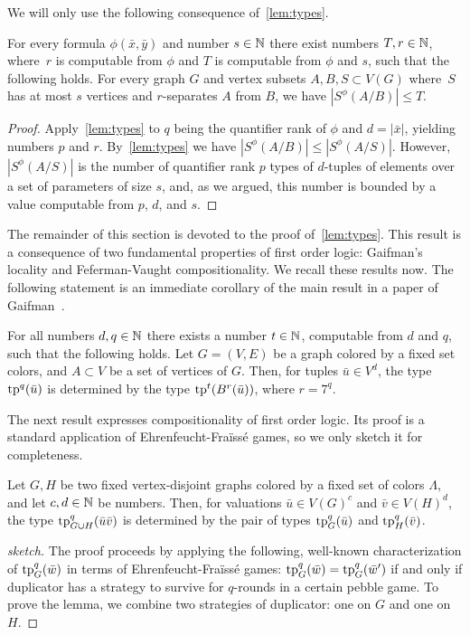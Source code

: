 We will only use the following consequence of~\cref{lem:types}.

\begin{corollary}\label{cor:bound}
For every formula $\phi(\bar x,\bar y)$ 
and number $s\in \mathbb{N}$
there exist numbers $T,r\in \mathbb{N}$,
where~$r$ is computable from $\phi$ and $T$ is computable from $\phi$ and $s$,
  such that the following holds. For every graph $G$ and vertex subsets $A,B,S\subset V(G)$ 
  where~$S$ has at most $s$ vertices and $r$-separates $A$ from $B$, we have $|S^\phi(A/B)|\le T$.
\end{corollary}
\begin{proof}
Apply~\cref{lem:types} to $q$ being the quantifier rank of $\phi$ and $d=|\bar x|$, yielding numbers $p$ and $r$.
By~\cref{lem:types} we have $|S^\phi(A/B)|\leq |S^\phi(A/S)|$.
However, $|S^\phi(A/S)|$ is the number of quantifier rank $p$ types of $d$-tuples of elements over a set of parameters of size $s$, and, as we argued, this number is bounded by a value computable from $p$, $d$, and $s$.
\end{proof}

The remainder of this section is devoted to the proof of~\cref{lem:types}.
This result is a consequence of two fundamental properties of first order logic:
Gaifman's locality and Feferman-Vaught compositionality. We recall these results now.
The following statement is an immediate corollary of the main result in a paper of Gaifman~\cite{gaifman1982local}.

\begin{lemma}\label{lem:gaif}
  For all numbers $d,q\in \mathbb{N}$ there exists a number $t\in \mathbb{N}$, computable from $d$ and $q$, such that the following holds.
  Let $G=(V,E)$ be a graph colored by a fixed set colors, and $A\subset V$ be a set of vertices of $G$.
  Then, for tuples $\bar u\in V^d$, the type  $\mathrm{tp}^q(\bar u)$ is determined by the type $\mathrm{tp}^{t}(B^r(\bar u))$, where $r=7^q$.
\end{lemma}

The next result expresses compositionality of first order logic. Its proof is a standard application of Ehrenfeucht-Fra\"iss\'e games, so we only sketch it for completeness.

\begin{lemma}\label{lem:fv}
  Let $G,H$ be two fixed vertex-disjoint graphs colored by a fixed set of colors $\Lambda$, and let 
  $c,d\in\mathbb{N}$  be numbers.
  Then, for valuations $\bar u\in V(G)^{c}$ and $\bar v\in V(H)^{d}$, 
 the type 
 $\mathrm{tp}^q_{G\cup H}(\bar u\bar v)$
 is determined by the pair of types $\mathrm{tp}^q_G(\bar u)$ and $\mathrm{tp}^q_H(\bar v)$.
\end{lemma}
\begin{proof}[sketch]The proof proceeds by applying the following, well-known characterization of $\mathrm{tp}^q_G(\bar w)$ in terms of Ehrenfeucht-Fra\"iss\'e games:
$\mathrm{tp}^q_{G}(\bar w)=\mathrm{tp}^q_{G}(\bar w')$
if and only if duplicator has a strategy to survive for $q$-rounds in a certain pebble game.
To prove the lemma, we combine two strategies of duplicator: one on $G$ and one on $H$.
\end{proof}

